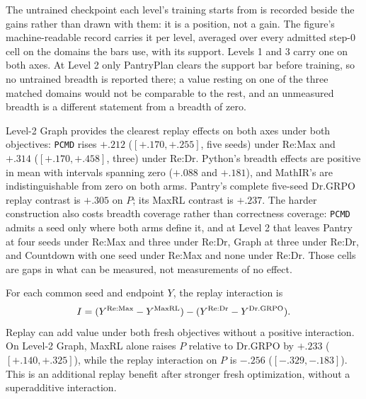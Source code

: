 \documentclass{article}
\makeatletter
\newcommand{\1}{\mathbf 1}
\newcommand{\pmd}{\texttt{PCMD}}
\newcommand{\distk}{\texttt{distinct@8}}
\theoremstyle{remark}
\theoremstyle{definition}
\theoremstyle{plain}
\makeatother
\begin{document}
The untrained checkpoint each level's training starts from is recorded beside
the gains rather than drawn with them: it is a position, not a gain. The figure's machine-readable record carries it per level, averaged over every
admitted step-0 cell on the domains the bars use, with its support. Levels 1 and 3 carry one on both
axes. At Level 2 only PantryPlan clears the support bar before training, so no
untrained breadth is reported there; a value resting on one of the three
matched domains would not be comparable to the rest, and an unmeasured breadth
is a different statement from a breadth of zero.

Level-2 Graph provides the clearest replay effects on both axes under both
objectives: \pmd{} rises $+.212$ ($[+.170,+.255]$, five seeds) under Re:Max and
$+.314$ ($[+.170,+.458]$, three) under Re:Dr. Python's breadth effects are
positive in mean with intervals spanning zero ($+.088$ and $+.181$), and
MathIR's are indistinguishable from zero on both arms. Pantry's complete
five-seed Dr.GRPO replay contrast is $+.305$ on $P$; its MaxRL contrast is
$+.237$. The harder construction also costs breadth coverage rather than
correctness coverage: \pmd{} admits a seed only where both arms define it, and
at Level 2 that leaves Pantry at four seeds under Re:Max and three under Re:Dr,
Graph at three under Re:Dr, and Countdown with one seed under Re:Max and none
under Re:Dr. Those cells are gaps in what can be measured, not measurements of
no effect.

For each common seed and endpoint $Y$, the replay interaction is
\[
 I=(Y^{\rm Re:Max}-Y^{\rm MaxRL})
    -(Y^{\rm Re:Dr}-Y^{\rm Dr.GRPO}).
\]
Replay can add value under both fresh objectives without a positive
interaction. On Level-2 Graph, MaxRL alone raises $P$ relative to Dr.GRPO
by $+.233$ ($[+.140,+.325]$), while the replay interaction on $P$ is
$-.256$ ($[-.329,-.183]$). This is an additional replay benefit after
stronger fresh optimization, without a superadditive interaction.

\begin{table}[H]
  \centering
  \caption{\textbf{Fresh-objective effects and replay interactions on Level 2.}
  All three contrasts within a domain use the same four-arm seed
  intersection. The interaction is
  $(\mathrm{Re:Max}-\mathrm{MaxRL})-
  (\mathrm{Re:Dr}-\mathrm{Dr.GRPO})$.
  Each entry gives its mean and, only for a complete five-seed block, a
  paired unadjusted 95\% Student-$t$ interval. This is the one table that keeps
  the \distk{} axis: an interaction needs both differences on the same seed, and
  at Level 2 the seeds where all four arms define \pmd{} number five only on
  Python, four on MathIR, three on Graph, two on PantryPlan and none on
  Countdown --- too thin to carry the estimand.}
  \label{tab:level2-factorial-contrasts}
  \scriptsize
  \setlength{\tabcolsep}{3pt}
\end{table}
\end{document}
